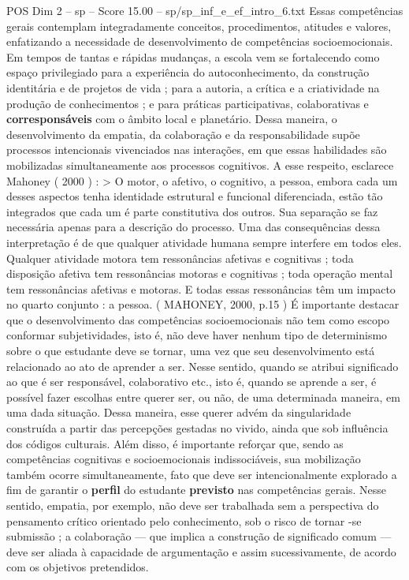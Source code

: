 \begin{textsample}{POS Dim 2 – sp – Score 15.00 – sp/sp\_inf\_e\_ef\_intro\_6.txt}  \label{ex:f2_pos_209}
Essas competências gerais contemplam integradamente conceitos, procedimentos, atitudes e valores, enfatizando a necessidade de desenvolvimento de competências socioemocionais.
Em tempos de tantas e rápidas mudanças, a escola vem se fortalecendo como espaço privilegiado para a experiência do autoconhecimento, da construção identitária e de projetos de vida ; para a autoria, a crítica e a criatividade na produção de conhecimentos ; e para práticas participativas, colaborativas e \textbf{corresponsáveis} com o âmbito local e planetário.
Dessa maneira, o desenvolvimento da empatia, da colaboração e da responsabilidade supõe processos intencionais vivenciados nas interações, em que essas habilidades são mobilizadas simultaneamente aos processos cognitivos.
A esse respeito, esclarece Mahoney ( 2000 ) : > O motor, o afetivo, o cognitivo, a pessoa, embora cada um desses aspectos tenha identidade estrutural e funcional diferenciada, estão tão integrados que cada um é parte constitutiva dos outros.
Sua separação se faz necessária apenas para a descrição do processo.
Uma das consequências dessa interpretação é de que qualquer atividade humana sempre interfere em todos eles.
Qualquer atividade motora tem ressonâncias afetivas e cognitivas ; toda disposição afetiva tem ressonâncias motoras e cognitivas ; toda operação mental tem ressonâncias afetivas e motoras.
E todas essas ressonâncias têm um impacto no quarto conjunto : a pessoa. ( MAHONEY, 2000, p.15 ) É importante destacar que o desenvolvimento das competências socioemocionais não tem como escopo conformar subjetividades, isto é, não deve haver nenhum tipo de determinismo sobre o que estudante deve se tornar, uma vez que seu desenvolvimento está relacionado ao ato de aprender a ser.
Nesse sentido, quando se atribui significado ao que é ser responsável, colaborativo etc., isto é, quando se aprende a ser, é possível fazer escolhas entre querer ser, ou não, de uma determinada maneira, em uma dada situação.
Dessa maneira, esse querer advém da singularidade construída a partir das percepções gestadas no vivido, ainda que sob influência dos códigos culturais.
Além disso, é importante reforçar que, sendo as competências cognitivas e socioemocionais indissociáveis, sua mobilização também ocorre simultaneamente, fato que deve ser intencionalmente explorado a fim de garantir o \textbf{perfil} do estudante \textbf{previsto} nas competências gerais.
Nesse sentido, empatia, por exemplo, não deve ser trabalhada sem a perspectiva do pensamento crítico orientado pelo conhecimento, sob o risco de tornar -se submissão ; a colaboração — que implica a construção de significado comum — deve ser aliada à capacidade de argumentação e assim sucessivamente, de acordo com os objetivos pretendidos.

\end{textsample}
